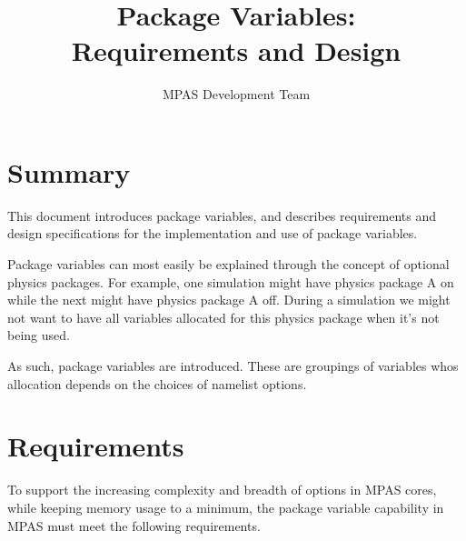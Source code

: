 \documentclass[11pt]{report}
\begin{document}
\title{Package Variables: \\
Requirements and Design}
\author{MPAS Development Team}

\maketitle
\tableofcontents


\chapter{Summary}

This document introduces package variables, and describes requirements and
design specifications for the implementation and use of package variables.

Package variables can most easily be explained through the concept of optional
physics packages. For example, one simulation might have physics package A on
while the next might have physics package A off. During a simulation we might
not want to have all variables allocated for this physics package when it's not
being used.

As such, package variables are introduced. These are groupings of variables
whos allocation depends on the choices of namelist options. 


\chapter{Requirements}

To support the increasing complexity and breadth of options in MPAS cores,
while keeping memory usage to a minimum, the package variable capability in MPAS
must meet the following requirements.
\end{document}

